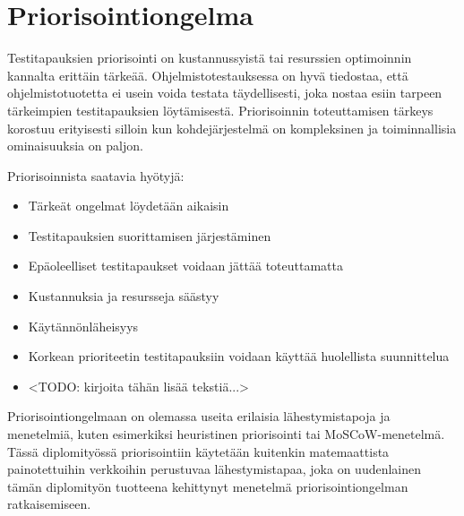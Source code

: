\section{Priorisointiongelma} \label{ch:08_priorisointiongelma}

  Testitapauksien priorisointi on kustannussyistä tai resurssien optimoinnin kannalta erittäin tärkeää.
  Ohjelmistotestauksessa on hyvä tiedostaa, että ohjelmistotuotetta ei usein voida testata täydellisesti, joka nostaa esiin tarpeen tärkeimpien testitapauksien löytämisestä.
  Priorisoinnin toteuttamisen tärkeys korostuu erityisesti silloin kun kohdejärjestelmä on kompleksinen ja toiminnallisia ominaisuuksia on paljon.

  Priorisoinnista saatavia hyötyjä:
  \begin{itemize}
    \item Tärkeät ongelmat löydetään aikaisin
    \item Testitapauksien suorittamisen järjestäminen
    \item Epäoleelliset testitapaukset voidaan jättää toteuttamatta
    \item Kustannuksia ja resursseja säästyy
    \item Käytännönläheisyys
    \item Korkean prioriteetin testitapauksiin voidaan käyttää huolellista suunnittelua
  \end{itemize}

  \begin{itemize}
    \item <TODO: kirjoita tähän lisää tekstiä...>
  \end{itemize}

  Priorisointiongelmaan on olemassa useita erilaisia lähestymistapoja ja menetelmiä, kuten esimerkiksi heuristinen priorisointi tai MoSCoW-menetelmä.
  Tässä diplomityössä priorisointiin käytetään kuitenkin matemaattista painotettuihin verkkoihin perustuvaa lähestymistapaa, joka on uudenlainen tämän diplomityön tuotteena kehittynyt menetelmä priorisointiongelman ratkaisemiseen.
